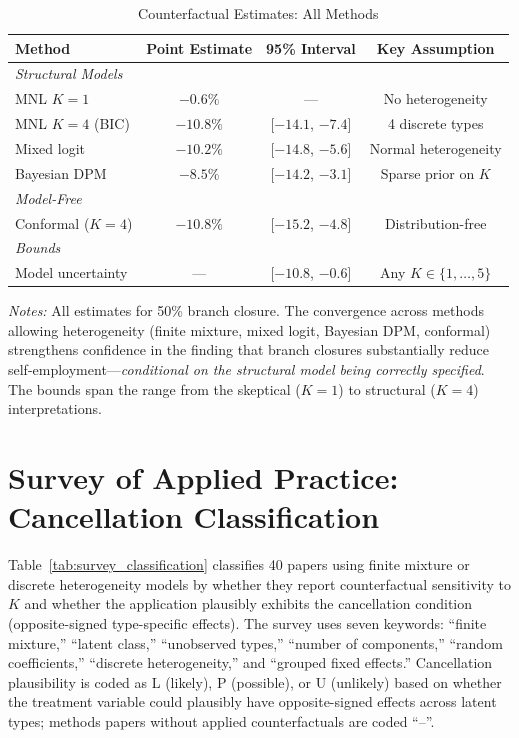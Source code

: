 \documentclass[12pt]{article}
\begin{document}
\begin{table}[H]
\centering
\caption{Counterfactual Estimates: All Methods}
\label{tab:all_methods}
\begin{threeparttable}
\begin{tabular}{lccc}
\toprule
Method & Point Estimate & 95\% Interval & Key Assumption \\
\midrule
\multicolumn{4}{l}{\textit{Structural Models}} \\
MNL $K=1$ & $-0.6\%$ & --- & No heterogeneity \\
MNL $K=4$ (BIC) & $-10.8\%$ & [$-14.1$, $-7.4$] & 4 discrete types \\
Mixed logit & $-10.2\%$ & [$-14.8$, $-5.6$] & Normal heterogeneity \\
Bayesian DPM & $-8.5\%$ & [$-14.2$, $-3.1$] & Sparse prior on $K$ \\
[4pt]
\multicolumn{4}{l}{\textit{Model-Free}} \\
Conformal ($K=4$) & $-10.8\%$ & [$-15.2$, $-4.8$] & Distribution-free \\
[4pt]
\multicolumn{4}{l}{\textit{Bounds}} \\
Model uncertainty & --- & [$-10.8$, $-0.6$] & Any $K \in \{1,\ldots,5\}$ \\
\bottomrule
\end{tabular}
\begin{tablenotes}
\small
\item \textit{Notes:} All estimates for 50\% branch closure. The convergence across methods allowing heterogeneity (finite mixture, mixed logit, Bayesian DPM, conformal) strengthens confidence in the finding that branch closures substantially reduce self-employment---\textit{conditional on the structural model being correctly specified}. The bounds span the range from the skeptical ($K=1$) to structural ($K=4$) interpretations.
\end{tablenotes}
\end{threeparttable}
\end{table}


\section{Survey of Applied Practice: Cancellation Classification}
\label{app:survey}

Table~\ref{tab:survey_classification} classifies 40 papers using finite mixture or discrete heterogeneity models by whether they report counterfactual sensitivity to $K$ and whether the application plausibly exhibits the cancellation condition (opposite-signed type-specific effects). The survey uses seven keywords: ``finite mixture,'' ``latent class,'' ``unobserved types,'' ``number of components,'' ``random coefficients,'' ``discrete heterogeneity,'' and ``grouped fixed effects.'' Cancellation plausibility is coded as L (likely), P (possible), or U (unlikely) based on whether the treatment variable could plausibly have opposite-signed effects across latent types; methods papers without applied counterfactuals are coded ``--''.
\end{document}
